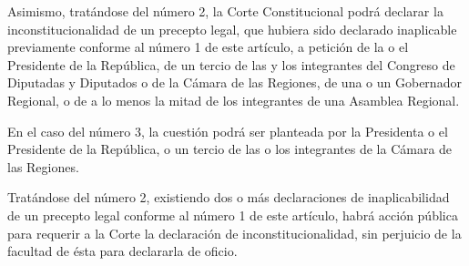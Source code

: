 \documentclass[11pt, a4paper]{article}
\begin{document}
\begin{enumerate}
Asimismo, tratándose del número 2, la Corte Constitucional podrá declarar la inconstitucionalidad de un precepto legal, que hubiera sido declarado inaplicable previamente conforme al número 1 de este artículo, a petición de la o el Presidente de la República, de un tercio de las y los integrantes del Congreso de Diputadas y Diputados o de la Cámara de las Regiones, de una o un Gobernador Regional, o de a lo menos la mitad de los integrantes de una Asamblea Regional. 

En el caso del número 3, la cuestión podrá ser planteada por la Presidenta o el Presidente de la República, o un tercio de las o los integrantes de la Cámara de las Regiones. 

Tratándose del número 2, existiendo dos o más declaraciones de inaplicabilidad de un precepto legal conforme al número 1 de este artículo, habrá acción pública para requerir a la Corte la declaración de inconstitucionalidad, sin perjuicio de la facultad de ésta para declararla de oficio. 


\end{enumerate}
\end{document}
